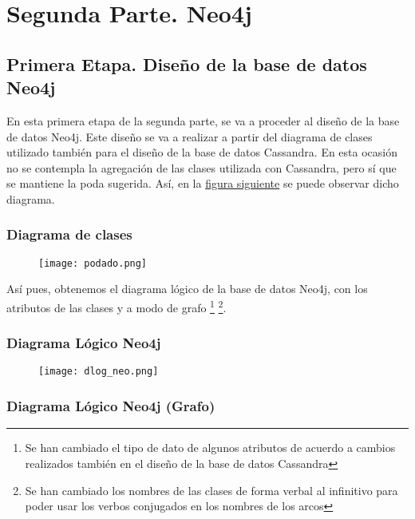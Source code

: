 \documentclass[a4paper]{article}
\begin{document}
\newpage

\section{\Huge{Segunda Parte. Neo4j}}
\subsection{\huge{Primera Etapa. Diseño de la base de datos Neo4j}}

En esta primera etapa de la segunda parte, se va a proceder al diseño de la base de datos Neo4j. Este diseño se va a realizar a partir del diagrama de clases utilizado también para el diseño de la base de datos Cassandra. En esta ocasión no se contempla la agregación de las clases utilizada con Cassandra, pero sí que se mantiene la poda sugerida. Así, en la \hyperref[fig:podado]{figura siguiente} se puede observar dicho diagrama.

\subsubsection{\Large{Diagrama de clases}}

\begin{figure}[H]
    \centering
    \texttt{[image: podado.png]}
    \label{fig:podado}
\end{figure}

Así pues, obtenemos el diagrama lógico de la base de datos Neo4j, con los atributos de las clases y a modo de grafo \footnote{Se han cambiado el tipo de dato de algunos atributos de acuerdo a cambios realizados también en el diseño de la base de datos Cassandra} \footnote{Se han cambiado los nombres de las clases de forma verbal al infinitivo para poder usar los verbos conjugados en los nombres de los arcos}.

\newpage

\subsubsection{\Large{Diagrama Lógico Neo4j}}

\begin{figure}[H]
    \centering
    \texttt{[image: dlog\_neo.png]}
    \label{fig:dlog_neo}
\end{figure}

\subsubsection{\Large{Diagrama Lógico Neo4j (Grafo)}}
\end{document}

